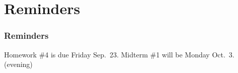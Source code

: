 \documentclass[11pt]{beamer}
\begin{document}
\section{Reminders}

\begin{frame}
  \frametitle{Reminders}
  \Enlarge

  \begin{itemize}
  \myitem  Homework \#4 is due Friday Sep.\ 23.
  \myitem  Midterm \#1 will be Monday Oct.\ 3.  (evening)
  \end{itemize}
\end{frame}
\end{document}
